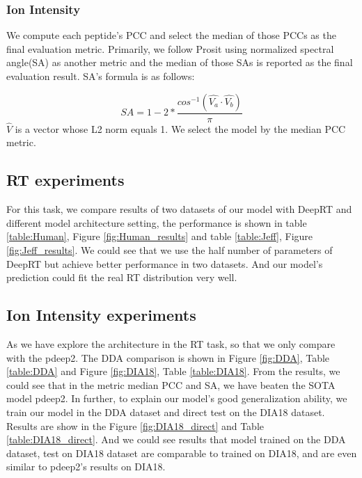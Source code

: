 \subsubsection*{Ion Intensity}
We compute each peptide's PCC and select the median of those PCCs as the final evaluation metric.
Primarily, we follow Prosit\cite{gessulat2019prosit} using normalized
spectral angle(SA) as another metric and the median of those SAs is reported as the final evaluation result.
SA's formula is as follows:

\[ SA = 1 - 2 * \frac{cos^{-1}(\hat{V_a}\cdot\hat{V_b})}{\pi} \]
$\hat{V}$ is a vector whose L2 norm equals 1. We select the model by the median PCC metric.

\subsection{RT experiments}
For this task, we compare results of two datasets of our model with DeepRT and different model architecture setting, the performance
is shown in table \ref{table:Human}, Figure \ref{fig:Human_results} and table \ref{table:Jeff}, Figure \ref{fig:Jeff_results}. We could see that we use the
half number of parameters of DeepRT but achieve better performance in two datasets. And our model's prediction could
fit the real RT distribution very well.



%
%
%
%
%

\subsection{Ion Intensity experiments}
As we have explore the architecture in the RT task, so that we only compare with the pdeep2.
The DDA comparison is shown in Figure \ref{fig:DDA}, Table \ref{table:DDA} and Figure \ref{fig:DIA18},
Table \ref{table:DIA18}.
From the results, we could see that in the metric median PCC and SA, we have beaten the SOTA model
pdeep2. In further, to explain our model's good generalization ability, we train our model in the DDA
dataset and direct test on the DIA18 dataset. Results are show in the Figure \ref{fig:DIA18_direct} and Table \ref{table:DIA18_direct}.
And we could see results that model trained on the DDA dataset, test on DIA18 dataset are comparable to trained
on DIA18, and are even similar to pdeep2's results on DIA18.

